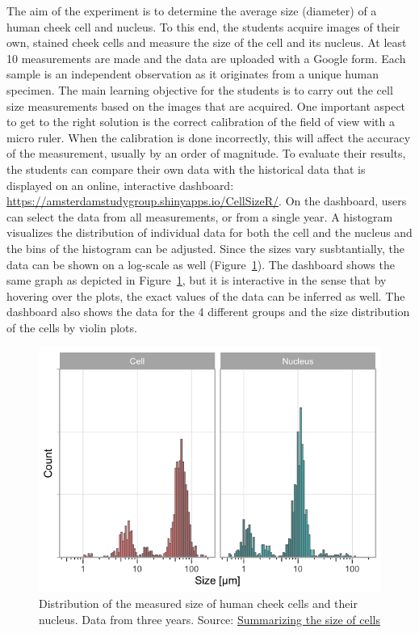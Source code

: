 \documentclass[
]{agujournal2019}
\begin{document}
The aim of the experiment is to determine the average size (diameter) of
a human cheek cell and nucleus. To this end, the students acquire images
of their own, stained cheek cells and measure the size of the cell and
its nucleus. At least 10 measurements are made and the data are uploaded
with a Google form. Each sample is an independent observation as it
originates from a unique human specimen. The main learning objective for
the students is to carry out the cell size measurements based on the
images that are acquired. One important aspect to get to the right
solution is the correct calibration of the field of view with a micro
ruler. When the calibration is done incorrectly, this will affect the
accuracy of the measurement, usually by an order of magnitude. To
evaluate their results, the students can compare their own data with the
historical data that is displayed on an online, interactive dashboard:
\url{https://amsterdamstudygroup.shinyapps.io/CellSizeR/}. On the
dashboard, users can select the data from all measurements, or from a
single year. A histogram visualizes the distribution of individual data
for both the cell and the nucleus and the bins of the histogram can be
adjusted. Since the sizes vary susbtantially, the data can be shown on a
log-scale as well (Figure~\ref{fig-histogram}). The dashboard shows the
same graph as depicted in Figure~\ref{fig-histogram}, but it is
interactive in the sense that by hovering over the plots, the exact
values of the data can be inferred as well. The dashboard also shows the
data for the 4 different groups and the size distribution of the cells
by violin plots.

\begin{figure}[H]

{\centering \includegraphics{index_files/figure-latex/fig-histogram-output-1.png}

}

\caption{\label{fig-histogram}Distribution of the measured size of human
cheek cells and their nucleus. Data from three years. Source:
\href{https://JoachimGoedhart.github.io/MS-StudentSourcing/notebooks/CellSizeR-preview.html\#cell-fig-histogram}{Summarizing
the size of cells}}

\end{figure}
\end{document}

